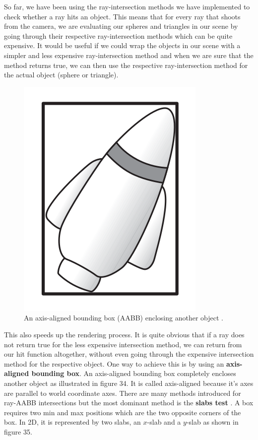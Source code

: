 \documentclass[11pt,a4paper]{article}
\begin{document}
	So far, we have been using the ray-intersection methods we have implemented to check whether a ray hits an object. This means that for every ray that shoots from the camera, we are evaluating our spheres and triangles in our scene by going through their respective ray-intersection methods which can be quite expensive. It would be useful if we could wrap the objects in our scene with a simpler and less expensive ray-intersection method and when we are sure that the method returns true, we can then use the respective ray-intersection method for the actual object (sphere or triangle).
	\begin{figure}[H]
		\centering
		\captionsetup{justification=centering}
		\includegraphics[width=.2\textwidth]{aabb}\quad
		\caption{An axis-aligned bounding box (AABB) enclosing another object \protect\cite{ericson2004real}.}
	\end{figure}
 	\noindent
	This also speeds up the rendering process. It is quite obvious that if a ray does not return true for the less expensive intersection method, we can return from our hit function altogether, without even going through the expensive intersection method for the respective object. One way to achieve this is by using an \textbf{axis-aligned bounding box}. An axis-aligned bounding box completely encloses another object as illustrated in figure 34. It is called axis-aligned because it's axes are parallel to world coordinate axes. There are many methods introduced for ray-AABB intersections but the most dominant method is the \textbf{slabs test} \cite{kay1986ray}.
	\noindent
	A box requires two min and max positions which are the two opposite corners of the box. In 2D, it is represented by two slabs, an $x$-slab and a $y$-slab as shown in figure 35.
\end{document}
